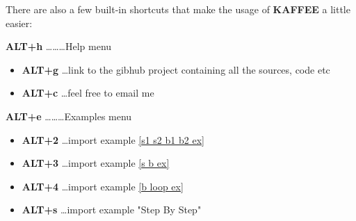 \documentclass[12pt]{report}
\numberwithin{figure}{chapter}
\theoremstyle{break}
\begin{document}
\bigskip
There are also a few built-in shortcuts that make the usage of \textbf{KAFFEE} a little easier:
\begin{description}
	\item{\textbf{ALT+h} \dots\dots\dots Help menu}
	\begin{itemize}
		\item{\textbf{ALT+g} \dots link to the gibhub project containing all the sources, code etc}
		\item{\textbf{ALT+c} \dots feel free to email me}
	\end{itemize}
	\item{\textbf{ALT+e} \dots\dots\dots Examples menu}
	\begin{itemize}
		\item{\textbf{ALT+2} \dots import example \ref{s1 s2 b1 b2 ex}}
		\item{\textbf{ALT+3} \dots import example \ref{s b ex}}
		\item{\textbf{ALT+4} \dots import example \ref{b loop ex}}
		\item{\textbf{ALT+s} \dots import example "Step By Step"}
	\end{itemize}
\end{description}

\printbibliography
\end{document}
